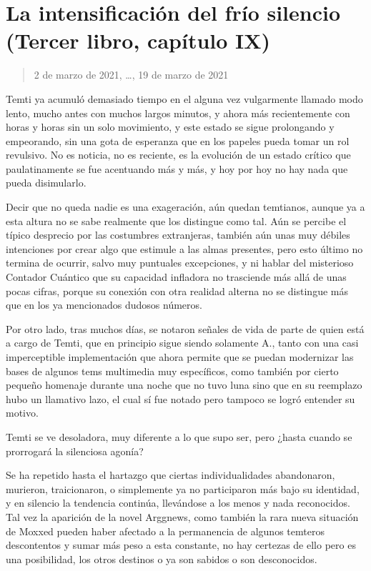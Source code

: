 \documentclass[
]{book}
\begin{document}
\hypertarget{la-intensificaciuxf3n-del-fruxedo-silencio-tercer-libro-capuxedtulo-ix}{%
\section{La intensificación del frío silencio (Tercer libro, capítulo IX)}\label{la-intensificaciuxf3n-del-fruxedo-silencio-tercer-libro-capuxedtulo-ix}}

\begin{quote}
2 de marzo de 2021, \ldots, 19 de marzo de 2021
\end{quote}

Temti ya acumuló demasiado tiempo en el alguna vez vulgarmente llamado modo lento, mucho antes con muchos largos minutos, y ahora más recientemente con horas y horas sin un solo movimiento, y este estado se sigue prolongando y empeorando, sin una gota de esperanza que en los papeles pueda tomar un rol revulsivo. No es noticia, no es reciente, es la evolución de un estado crítico que paulatinamente se fue acentuando más y más, y hoy por hoy no hay nada que pueda disimularlo.

Decir que no queda nadie es una exageración, aún quedan temtianos, aunque ya a esta altura no se sabe realmente que los distingue como tal. Aún se percibe el típico desprecio por las costumbres extranjeras, también aún unas muy débiles intenciones por crear algo que estimule a las almas presentes, pero esto último no termina de ocurrir, salvo muy puntuales excepciones, y ni hablar del misterioso Contador Cuántico que su capacidad infladora no trasciende más allá de unas pocas cifras, porque su conexión con otra realidad alterna no se distingue más que en los ya mencionados dudosos números.

Por otro lado, tras muchos días, se notaron señales de vida de parte de quien está a cargo de Temti, que en principio sigue siendo solamente A., tanto con una casi imperceptible implementación que ahora permite que se puedan modernizar las bases de algunos tems multimedia muy específicos, como también por cierto pequeño homenaje durante una noche que no tuvo luna sino que en su reemplazo hubo un llamativo lazo, el cual sí fue notado pero tampoco se logró entender su motivo.

Temti se ve desoladora, muy diferente a lo que supo ser, pero ¿hasta cuando se prorrogará la silenciosa agonía?

Se ha repetido hasta el hartazgo que ciertas individualidades abandonaron, murieron, traicionaron, o simplemente ya no participaron más bajo su identidad, y en silencio la tendencia continúa, llevándose a los menos y nada reconocidos.
Tal vez la aparición de la novel Arggnews, como también la rara nueva situación de Moxxed pueden haber afectado a la permanencia de algunos temteros descontentos y sumar más peso a esta constante, no hay certezas de ello pero es una posibilidad, los otros destinos o ya son sabidos o son desconocidos.
\end{document}

